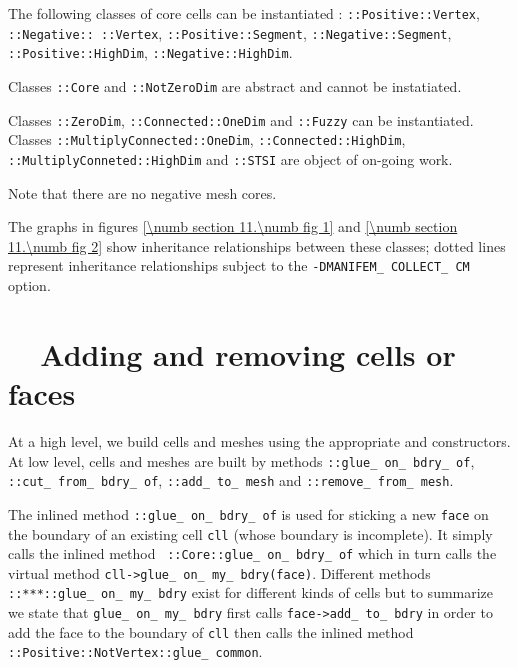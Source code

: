 The following classes of core cells can be instantiated :
{\small\tt {}::Positive::Vertex}, {\small\tt {}::Negative:: ::Vertex},
{\small\tt {}::Positive::Segment}, {\small\tt {}::Negative::Segment},
{\small\tt {}::Positive::HighDim},\break
{\small\tt {}::Negative::HighDim}.

Classes {\small\tt {}::Core} and {\small\tt {}::NotZeroDim} are abstract
and cannot be instatiated.

Classes {\small\tt {}::ZeroDim}, {\small\tt {}::Connected::OneDim} and
{\small\tt {}::Fuzzy} can be instantiated.
Classes {\small\tt {}::MultiplyConnected::OneDim},
{\small\tt {}::Connected::HighDim}, {\small\tt {}::MultiplyConneted::HighDim}
and {\small\tt {}::STSI} are object of on-going work.

Note that there are no negative mesh cores.

The graphs in figures \ref{\numb section 11.\numb fig 1} and \ref{\numb section 11.\numb fig 2}
show inheritance relationships between these classes; dotted lines represent
inheritance relationships  subject to the {\small\tt -DMANIFEM\_\,COLLECT\_\,CM} option.


\section{~~Adding and removing cells or faces}\label{\numb section 11.\numb parag 9}

At a high level, we build cells and meshes using the appropriate {\small\tt {}} and
{\small\tt {}} constructors.
At low level, cells and meshes are built by methods {\small\tt {}::glue\_\,on\_\,bdry\_\,of},
{\small\tt {}::cut\_\,from\_\,bdry\_\,of}, {\small\tt {}::add\_\,to\_\,mesh} and
{\small\tt {}::remove\_\,from\_\,mesh}.

The inlined method {\small\tt {}::glue\_\,on\_\,bdry\_\,of} is used for sticking a new
{\small\tt face} on the
boundary of an existing cell {\small\tt cll} (whose boundary is incomplete).
It simply calls the inlined method \ {\small\tt {}::Core::glue\_\,on\_\,bdry\_\,of}
which in turn calls the virtual method {\small\tt cll->glue\_\,on\_\,my\_\,bdry(face)}.
Different methods {\small\tt {}::***::glue\_\,on\_\,my\_\,bdry} exist for different kinds of
cells but to summarize we state that {\small\tt glue\_\,on\_\,my\_\,bdry} first calls
{\small\tt face->add\_\,to\_\,bdry} in order to add the face to the boundary of {\small\tt cll}
then calls the inlined method {\small\tt {}::Positive::NotVertex::glue\_\,common}.

